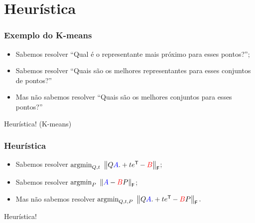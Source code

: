 
\section{Heurística}

\begin{frame}
  \frametitle{Exemplo do K-means}
  \begin{itemize}
    \item Sabemos resolver ``Qual é o representante mais próximo para esses pontos?'';
    \item Sabemos resolver ``Quais são os melhores representantes para esses conjuntos de pontos?''
    \item Mas não sabemos resolver ``Quais são os melhores conjuntos para esses pontos?''
  \end{itemize}

  \begin{center}
    Heurística! (K-means)
  \end{center}
\end{frame}

\begin{frame}[fragile]
  \frametitle{Heurística}
  \begin{itemize}
    \item Sabemos resolver $\text{argmin}_{Q,t}\,\, \left\lVert Q\textcolor{blue}{A} .+ t e^{\mathsf{T}\mkern-1mu} - \textcolor{red}{B}\right\rVert_\mathsf{F}$;
    \item Sabemos resolver $\text{argmin}_{P}\,\, \left\lVert\textcolor{blue}{A} - \textcolor{red}{B}P\right\rVert_\mathsf{F}$;
    \item Mas não sabemos resolver $\text{argmin}_{Q,t,P}\,\, \left\lVert Q\textcolor{blue}{A} .+ t e^{\mathsf{T}\mkern-1mu} - \textcolor{red}{B}P\right\rVert_\mathsf{F}.$
  \end{itemize}

  \begin{center}
    Heurística!
  \end{center}
\end{frame}
